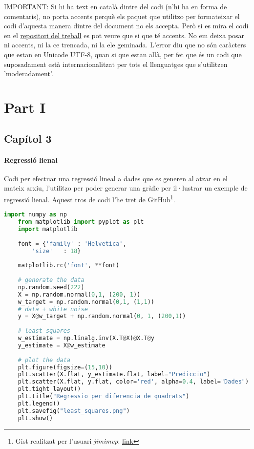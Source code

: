 IMPORTANT: Si hi ha text en català dintre del codi (n'hi ha en forma de comentaris), no porta accents perquè els paquet que utilitzo per formateixar el codi d'aquesta manera dintre del document no els accepta. Però si es mira el codi en el \href{https://github.com/tomiock/qGAN}{repositori del treball} es pot veure que si que té accents. No em deixa posar ni accents, ni la ce trencada, ni la ele geminada. L'error diu que no són caràcters que estan en Unicode UTF-8, quan si que estan allà, per fet que és un codi que suposadament està internacionalitzat per tots el llenguatges que s'utilitzen 'moderadament'. 

\section{Part I}
\subsection{Capítol 3}

\paragraph{Regressió lienal}
\label{lst:linear_regression}
Codi per efectuar una regressió lineal a dades que es generen al atzar en el mateix arxiu, l'utilitzo per poder generar una gràfic per il·lustrar un exemple de regressió lienal. Aquest tros de codi l'he tret de GitHub\footnote{Gist realitzat per l'usuari \textit{jimimvp}: \href{https://gist.github.com/jimimvp/05ece11fec25d5c8c009af9ba469d6c2}{link}}.

\begin{lstlisting}[language=Python, caption=Regressió lineal]
	import numpy as np
	from matplotlib import pyplot as plt
	import matplotlib
	
	font = {'family' : 'Helvetica',
		'size'   : 18}
	
	matplotlib.rc('font', **font)
	
	# generate the data
	np.random.seed(222)
	X = np.random.normal(0,1, (200, 1))
	w_target = np.random.normal(0,1, (1,1))
	# data + white noise
	y = X@w_target + np.random.normal(0, 1, (200,1))
	
	# least squares
	w_estimate = np.linalg.inv(X.T@X)@X.T@y
	y_estimate = X@w_estimate
	
	# plot the data
	plt.figure(figsize=(15,10))
	plt.scatter(X.flat, y_estimate.flat, label="Prediccio")
	plt.scatter(X.flat, y.flat, color='red', alpha=0.4, label="Dades")
	plt.tight_layout()
	plt.title("Regressio per diferencia de quadrats")
	plt.legend()
	plt.savefig("least_squares.png")
	plt.show()
\end{lstlisting}

